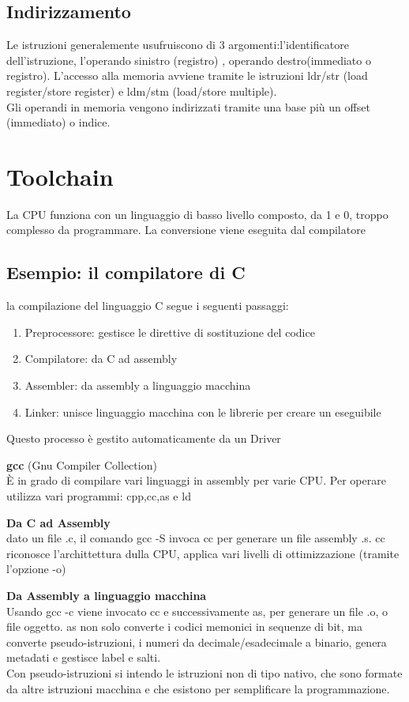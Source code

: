 \documentclass[12pt, a4paper]{article}
\begin{document}
\subsection{Indirizzamento}
Le istruzioni generalemente usufruiscono di 3 argomenti:l'identificatore dell'istruzione, l'operando sinistro (registro)
, operando destro(immediato o registro). L'accesso alla memoria avviene tramite le istruzioni ldr/str 
(load register/store register) e ldm/stm (load/store multiple).\\Gli operandi in memoria vengono indirizzati tramite
una base più un offset (immediato) o indice.




\newpage
\thispagestyle{fancy}
\section{Toolchain}
La CPU funziona con un linguaggio di basso livello composto, da 1 e 0, troppo complesso da programmare. La conversione
viene eseguita dal compilatore

\subsection{Esempio: il compilatore di C}
la compilazione del linguaggio C segue i seguenti passaggi:
\begin{enumerate}
  \item Preprocessore: gestisce le direttive di sostituzione del codice
  \item Compilatore: da C ad assembly 
  \item Assembler: da assembly a linguaggio macchina
  \item Linker: unisce linguaggio macchina con le librerie per creare un eseguibile
\end{enumerate}
Questo processo è gestito automaticamente da un Driver

\textbf{gcc} (Gnu Compiler Collection)\\ È in grado di compilare vari linguaggi in assembly per varie CPU. Per 
operare utilizza vari programmi: cpp,cc,as e ld 

\textbf{Da C ad Assembly}\\ dato un file .c, il comando gcc -S invoca cc per generare un file assembly .s.
cc riconosce l'archittettura dulla CPU, applica vari livelli di ottimizzazione (tramite l'opzione -o)

\textbf{Da Assembly a linguaggio macchina}\\ Usando gcc -c viene invocato cc e successivamente as, per generare un
file .o, o file oggetto. as non solo converte i codici memonici in sequenze di bit, ma converte pseudo-istruzioni,
i numeri da decimale/esadecimale a binario, genera metadati e gestisce label e salti.\\
Con pseudo-istruzioni si intendo le istruzioni non di tipo nativo, che sono formate da altre istruzioni macchina
e che esistono per semplificare la programmazione.
\end{document}
